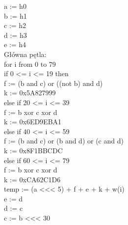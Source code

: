 \documentclass[oneside]{mgr}
\begin{document}
\hspace*{10mm}a := h0\\
\hspace*{10mm}b := h1\\
\hspace*{10mm}c := h2\\
\hspace*{10mm}d := h3\\
\hspace*{10mm}e := h4\\
\hspace*{10mm}Główna pętla:\\
\hspace*{10mm}for i from 0 to 79\\
\hspace*{20mm}if 0 <= i <= 19 then\\
\hspace*{30mm}f := (b and c) or ((not b) and d)\\
\hspace*{30mm}k := 0x5A827999\\
\hspace*{20mm}else if 20 <= i <= 39\\
\hspace*{30mm}f := b xor c xor d\\
\hspace*{30mm}k := 0x6ED9EBA1\\
\hspace*{20mm}else if 40 <= i <= 59\\
\hspace*{30mm}f := (b and c) or (b and d) or (c and d)\\
\hspace*{30mm}k := 0x8F1BBCDC\\
\hspace*{20mm}else if 60 <= i <= 79\\
\hspace*{30mm}f := b xor c xor d\\
\hspace*{30mm}k := 0xCA62C1D6\\
\hspace*{20mm}temp := (a <<< 5) + f + e + k + w(i)\\
\hspace*{20mm}e := d\\
\hspace*{20mm}d := c\\
\hspace*{20mm}c := b <<< 30\\
\end{document}
